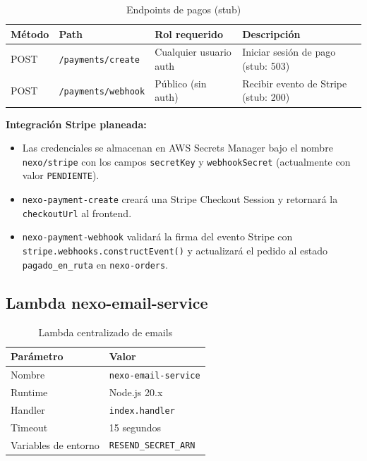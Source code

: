 \documentclass[12pt,a4paper]{article}
\begin{document}
\begin{table}[H]
\centering
\begin{tabular}{@{}llll@{}}
\toprule
\textbf{Método} & \textbf{Path} & \textbf{Rol requerido} & \textbf{Descripción} \\
\midrule
POST & \texttt{/payments/create}  & Cualquier usuario auth & Iniciar sesión de pago (stub: 503) \\
POST & \texttt{/payments/webhook} & Público (sin auth) & Recibir evento de Stripe (stub: 200) \\
\bottomrule
\end{tabular}
\caption{Endpoints de pagos (stub)}
\end{table}

\begin{nexobox}
\textbf{Integración Stripe planeada:}
\begin{itemize}
  \item Las credenciales se almacenan en AWS Secrets Manager bajo el nombre
    \texttt{nexo/stripe} con los campos \texttt{secretKey} y \texttt{webhookSecret}
    (actualmente con valor \texttt{PENDIENTE}).
  \item \texttt{nexo-payment-create} creará una Stripe Checkout Session y retornará
    la \texttt{checkoutUrl} al frontend.
  \item \texttt{nexo-payment-webhook} validará la firma del evento Stripe con
    \texttt{stripe.webhooks.constructEvent()} y actualizará el pedido al estado
    \texttt{pagado\_en\_ruta} en \texttt{nexo-orders}.
\end{itemize}
\end{nexobox}

\subsection{Lambda nexo-email-service}

\begin{table}[H]
\centering
\begin{tabular}{@{}ll@{}}
\toprule
\textbf{Parámetro} & \textbf{Valor} \\
\midrule
Nombre & \texttt{nexo-email-service} \\
Runtime & Node.js 20.x \\
Handler & \texttt{index.handler} \\
Timeout & 15 segundos \\
Variables de entorno & \texttt{RESEND\_SECRET\_ARN} \\
\bottomrule
\end{tabular}
\caption{Lambda centralizado de emails}
\end{table}
\end{document}

